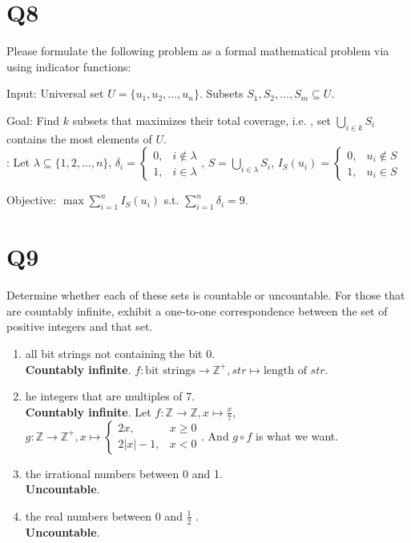 \documentclass[11pt]{article}
\newenvironment{qparts}{\begin{enumerate}[{(}a{)}]}{\end{enumerate}}
\newenvironment{solution}{{\bf Solution}:}{\smallskip}
\begin{document}
\section*{Q8}
Please formulate the following problem as a formal
mathematical problem via using indicator functions:

Input:
Universal set $U=\{ u_1,u_2, \ldots ,u_n \}$. Subsets $S_1,
S_2, \ldots ,S_m \subseteq U$.

Goal:
Find $k$ subsets that maximizes their total coverage, i.e. ,
set $\bigcup_{i \in k}S_i$ contains the most elements of $U$.
\\
\begin{solution}
    Let $\lambda \subseteq \{ 1,2, \ldots ,n \}$,
    $\delta_i=\begin{cases}
        0,&i \notin \lambda\\
        1,&i \in \lambda
    \end{cases}$,
    $S=\bigcup_{i \in \lambda} S_i$,
    $I_S(u_i)=
    \begin{cases}
        0,&u_i\notin S\\
        1,&u_i \in S
    \end{cases}$

    Objective: $\max \sum_{i=1}^{n}I_S(u_i)$
    s.t. $\sum_{i=1}^{n}\delta_i=9$.

\end{solution}

\section*{Q9}
Determine whether each of these sets is countable or
uncountable. For those that are countably inﬁnite, exhibit a
one-to-one correspondence between the set of positive integers
and that set.
\begin{qparts}
    
    \item all bit strings not containing the bit 0.\\
    \textbf{Countably inﬁnite}. $f \colon \text{bit strings} \to \mathbb{Z}^{+}, str \mapsto \text{length of }str$.
    
    \item he integers that are multiples of 7.\\
    \textbf{Countably inﬁnite}. Let $f \colon \mathbb{Z} 
    \to \mathbb{Z}, x \mapsto \frac{x}{7}$,
    $g \colon \mathbb{Z} \to \mathbb{Z}^{+}, x \mapsto 
    \begin{cases}
        2x,&x\ge 0\\
        2\left\vert x  \right\vert -1,&x<0
    \end{cases}$.
    And $g \circ f$ is what we want.
    
    \item the irrational numbers between 0 and 1.\\
    \textbf{Uncountable}.
    
    \item the real numbers between 0 and $\frac{1}{2}$ .\\
    \textbf{Uncountable}.

\end{qparts}
\end{document}
